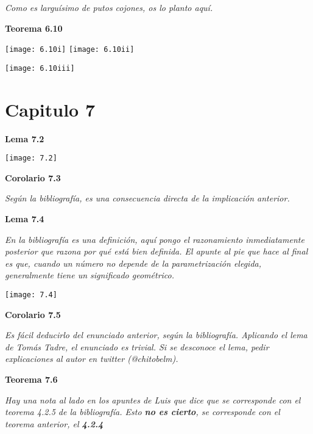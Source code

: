 \documentclass[openany]{book}
\begin{document}
\textit{Como es larguísimo de putos cojones, os lo planto aquí.}




\begin{center}
\textbf{Teorema 6.10}
\end{center}
\texttt{[image: 6.10i]}
\texttt{[image: 6.10ii]}

\texttt{[image: 6.10iii]}

\chapter{Capitulo 7}

\begin{center}
\textbf{Lema 7.2}
\end{center}

\texttt{[image: 7.2]}

\begin{center}
\textbf{Corolario 7.3}
\end{center}

\textit{Según la bibliografía, es una consecuencia directa de la implicación anterior.}

\begin{center}
\textbf{Lema 7.4}
\end{center}

\textit{En la bibliografía es una definición, aquí pongo el razonamiento inmediatamente posterior que razona por qué está bien definida. El apunte al pie que hace al final es que, cuando un número no depende de la parametrización elegida, generalmente tiene un significado geométrico.}

\texttt{[image: 7.4]}

\begin{center}
\textbf{Corolario 7.5}
\end{center}

\textit{Es fácil deducirlo del enunciado anterior, según la bibliografía. Aplicando el lema de Tomás Tadre, el enunciado es trivial. Si se desconoce el lema, pedir explicaciones al autor en twitter (@chitobelm).}

\newpage

\begin{center}
\textbf{Teorema 7.6}
\end{center}

\textit{Hay una nota al lado en los apuntes de Luis que dice que se corresponde con el teorema 4.2.5 de la bibliografía. Esto \textbf{no es cierto}, se corresponde con el teorema anterior, el \textbf{4.2.4}}
\end{document}
